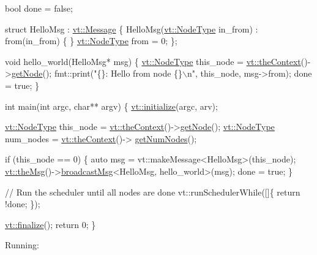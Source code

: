 \begin{DoxyCode}
\textcolor{keywordtype}{bool} done = \textcolor{keyword}{false};

\textcolor{keyword}{struct }HelloMsg : \hyperlink{structvt_1_1messaging_1_1_active_msg}{vt::Message} \{
  HelloMsg(\hyperlink{namespacevt_a866da9d0efc19c0a1ce79e9e492f47e2}{vt::NodeType} in\_from) : from(in\_from) \{ \}
  \hyperlink{namespacevt_a866da9d0efc19c0a1ce79e9e492f47e2}{vt::NodeType} from = 0;
\};

\textcolor{keywordtype}{void} hello\_world(HelloMsg* msg) \{
  \hyperlink{namespacevt_a866da9d0efc19c0a1ce79e9e492f47e2}{vt::NodeType} this\_node = \hyperlink{namespacevt_a26551fe0e6e6a1371111df5b12c7e92c}{vt::theContext}()->\hyperlink{structvt_1_1ctx_1_1_context_a0d52c263ce8516546a67443d9a86fa5f}{getNode}();
  fmt::print(\textcolor{stringliteral}{"\{\}: Hello from node \{\}\(\backslash\)n"}, this\_node, msg->from);
  done = \textcolor{keyword}{true};
\}

\textcolor{keywordtype}{int} main(\textcolor{keywordtype}{int} argc, \textcolor{keywordtype}{char}** argv) \{
  \hyperlink{namespacevt_aaa266774ea8339c58be0202b00fafa62}{vt::initialize}(argc, arv);

  \hyperlink{namespacevt_a866da9d0efc19c0a1ce79e9e492f47e2}{vt::NodeType} this\_node = \hyperlink{namespacevt_a26551fe0e6e6a1371111df5b12c7e92c}{vt::theContext}()->\hyperlink{structvt_1_1ctx_1_1_context_a0d52c263ce8516546a67443d9a86fa5f}{getNode}();
  \hyperlink{namespacevt_a866da9d0efc19c0a1ce79e9e492f47e2}{vt::NodeType} num\_nodes = \hyperlink{namespacevt_a26551fe0e6e6a1371111df5b12c7e92c}{vt::theContext}()->
      \hyperlink{structvt_1_1ctx_1_1_context_a7f41071aadf6d5fa9e1b6c703c5ff19d}{getNumNodes}();

  \textcolor{keywordflow}{if} (this\_node == 0) \{
    \textcolor{keyword}{auto} msg = vt::makeMessage<HelloMsg>(this\_node);
    \hyperlink{namespacevt_aeafd31f866aeb4dc6fc2f6ee97136350}{vt::theMsg}()->\hyperlink{group__typesafehan_ga344802a09eb0e88006900976d1dfa204}{broadcastMsg}<HelloMsg, hello\_world>(msg);
    done = \textcolor{keyword}{true};
  \}

  \textcolor{comment}{// Run the scheduler until all nodes are done}
  vt::runSchedulerWhile([]\{ \textcolor{keywordflow}{return} !done; \});

  \hyperlink{namespacevt_a540d90dbd6e97b69f1dcbc9ee9314cff}{vt::finalize}();
  \textcolor{keywordflow}{return} 0;
\}
\end{DoxyCode}


Running\+:


